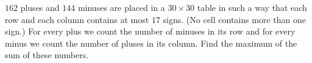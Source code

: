$162$ pluses and $144$ minuses are placed in a $30\times 30$ table in such a way that each row and each column contains at most $17$ signs. (No cell contains more than one sign.) For every plus we count the number of minuses in its row and for every minus we count the number of pluses in its column. Find the maximum of the sum of these numbers.